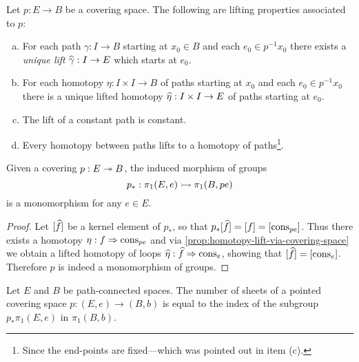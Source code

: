 \begin{corollary}
    \label{cor:lift-via-covering-space}
    Let \(p: E \to B\) be a covering space. The following are lifting properties
    associated to \(p\):
    \begin{enumerate}[(a)]\setlength\itemsep{0em}
        \item For each path \(\gamma: I \to B\) starting at \(x_0 \in B\) and each \(e_0
              \in p^{-1} x_0\) there exists a \emph{unique lift} \(\widehat \gamma: I \to E\)
              which starts at \(e_0\).

        \item For each homotopy \(\eta: I \times I \to B\) of paths starting at \(x_0\)
              and each \(e_0 \in p^{-1} x_0\) there is a unique lifted homotopy
              \(\widehat \eta: I \times I \to E\) of paths starting at \(e_0\).

        \item The lift of a constant path is constant.

        \item Every homotopy between paths lifts to a homotopy of paths\footnote{Since
                  the end-points are fixed---which was pointed out in item (c).}.
    \end{enumerate}
\end{corollary}

\begin{proposition}
    \label{proposition:covering-induces-monomorphism-fundamental-grps}
    Given a covering \(p: E \twoheadrightarrow B\), the induced morphism of groups
    \[
        p_{*}: \pi_1(E, e) \rightarrowtail \pi_1(B, p e)
    \]
    is a monomorphism for any \(e \in E\).
\end{proposition}

\begin{proof}
    Let \([\widehat f]\) be a kernel element of \(p_{*}\), so that
    \(p_{*}[\widehat f] = [f] = [\operatorname{cons}_{p e}]\). Thus there exists a homotopy
    \(\eta: f \Rightarrow \operatorname{cons}_{p e}\) and via
    \cref{prop:homotopy-lift-via-covering-space} we obtain a lifted homotopy of
    loops \(\widehat\eta: \widehat f \Rightarrow \operatorname{cons}_e\), showing that
    \([\widehat f] = [\operatorname{cons}_e]\). Therefore \(p\) is indeed a monomorphism of groups.
\end{proof}

\begin{proposition}
    \label{prop:covering-space-n-of-sheets-is-index}
    Let \(E\) and \(B\) be path-connected spaces. The number of sheets of a pointed
    covering space \(p: (E, e) \to (B, b)\) is equal to the index of the subgroup
    \(p_{*}\pi_1(E, e)\) in \(\pi_1(B, b)\).
\end{proposition}


